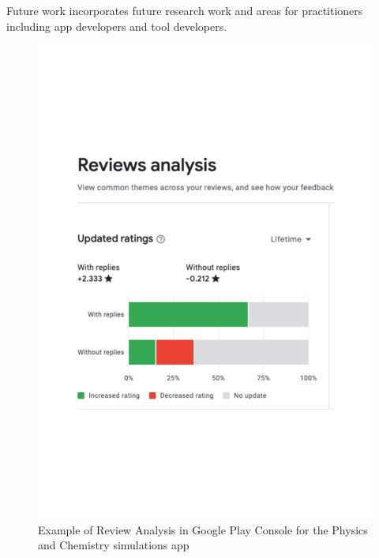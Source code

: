 Future work incorporates future research work and areas for practitioners including app developers and tool developers.

\begin{figure}
    \centering
    \includegraphics[width=\linewidth]{images/google-play-console/PhET-Review-Analysis-Screenshot-2022-09-07.pdf}
    \caption{Example of Review Analysis in Google Play Console for the Physics and Chemistry simulations app}
    \label{fig:PhET-Review-Analysis-Screenshot-2022-09-07}
\end{figure}

